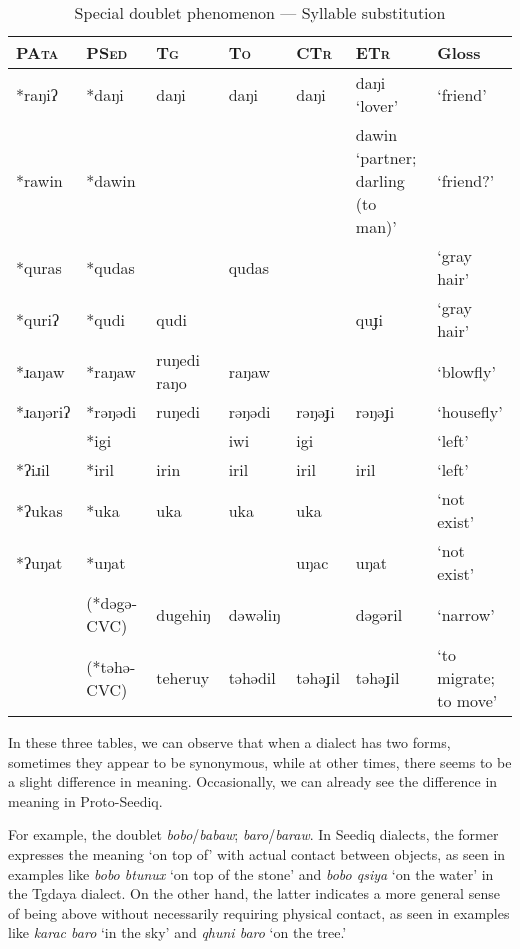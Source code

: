 \documentclass[12pt]{article}
\newcommand{\pata}{\textsc{PAta}\xspace}
\newcommand{\psed}{\textsc{PSed}\xspace}
\newcommand{\psedf}{Proto-Seediq\xspace}
\newcommand{\stg}{\textsc{Tg}\xspace}
\newcommand{\stgf}{Tgdaya\xspace}
\newcommand{\sto}{\textsc{To}\xspace}
\newcommand{\sctr}{\textsc{CTr}\xspace}
\newcommand{\setr}{\textsc{ETr}\xspace}
\begin{document}
\begin{table}[!htbp]
\centering
\caption{Special doublet phenomenon --- Syllable substitution}
\label{tab:gender3}
\begin{tabular}{lllllll}
\hline
\pata & \psed   & \stg    & \sto    & \sctr  & \setr         & Gloss                 \\ \hline
*raŋiʔ & *daŋi  &  daŋi  & daŋi   & daŋi       & daŋi `lover'  & `friend'             \\
*rawin & *dawin   &    &         &        & \makecell[l]{dawin `partner;\\darling (to man)'}         & `friend?'             \\
*quras & *qudas  &         & qudas   &        &               & `gray hair'             \\
*quriʔ & *qudi   & qudi    &         &        & quɟi          & `gray hair'             \\
*ɹaŋaw & *raŋaw  & ruŋedi raŋo  & raŋaw   &        &          & `blowfly' \\
*ɹaŋəriʔ & *rəŋədi & ruŋedi  & rəŋədi  & rəŋəɟi & rəŋəɟi        & `housefly'             \\
 & *igi    &         & iwi     & igi    &               & `left'                  \\
*ʔiɹil & *iril   & irin    & iril    & iril   & iril          & `left'                  \\
*ʔukas & *uka    & uka     & uka     & uka    &               & `not exist'             \\
*ʔuŋat & *uŋat   &         &         & uŋac   & uŋat          & `not exist'             \\
 & (*dəgə-CVC)  & dugehiŋ & dəwəliŋ &        & dəgəril       & `narrow'                \\
 & (*təhə-CVC)  & teheruy & təhədil & təhəɟil & təhəɟil      & \makecell[l]{`to migrate;\\to move'}   \\       
\hline
\end{tabular}
\end{table}

In these three tables, we can observe that when a dialect has two forms, sometimes they appear to be synonymous, while at other times, there seems to be a slight difference in meaning. Occasionally, we can already see the difference in meaning in \psedf.

For example, the doublet \textit{bobo}/\textit{babaw}; \textit{baro}/\textit{baraw}. In Seediq dialects, the former expresses the meaning `on top of' with actual contact between objects, as seen in examples like \textit{bobo btunux} `on top of the stone' and \textit{bobo qsiya} `on the water' in the \stgf dialect. On the other hand, the latter indicates a more general sense of being above without necessarily requiring physical contact, as seen in examples like \textit{karac baro} `in the sky' and \textit{qhuni baro} `on the tree.' 
\end{document}

